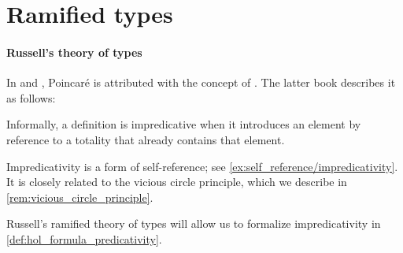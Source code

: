 \section{Ramified types}

\paragraph{Russell's theory of types}

\begin{concept}\label{con:impredicative_definition}
  In \cite[42]{Kleene1971Metamathematics} and \cite[146]{GowersEtAl2008PrincetonCompanion}, Poincar\'e is attributed with the concept of . The latter book describes it as follows:
  \begin{displayquote}
    Informally, a definition is impredicative when it introduces an element by reference to a totality that already contains that element.
  \end{displayquote}
\end{concept}
\begin{comments}
  \item Impredicativity is a form of self-reference; see \cref{ex:self_reference/impredicativity}. It is closely related to the vicious circle principle, which we describe in \cref{rem:vicious_circle_principle}.

  \item Russell's ramified theory of types will allow us to formalize impredicativity in \cref{def:hol_formula_predicativity}.
\end{comments}

